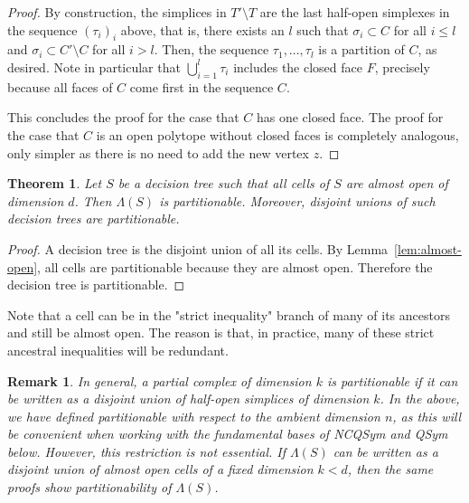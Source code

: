 \documentclass[12pt,reqno]{amsart}
\numberwithin{definition}{section}
\newtheorem{theorem}[definition]{Theorem}
\newtheorem{remark}[definition]{Remark}
\theoremstyle{definition}
\newcommand{\RR}{\mathbb{R}}
\newcommand{\allow}{\Lambda} %
\newcommand{\allowP}{\allow_{\RR^n_{> 0}}} %
\newcommand{\allowC}{\allow_{(0,1)^n}} %
\begin{document}
\begin{proof}
By construction, the simplices in $T'\setminus T$ are the last half-open simplexes in the sequence $(\tau_i)_i$ above, that is, there exists an $l$ such that $\sigma_i\subset C$ for all $i\leq l$ and $\sigma_i\subset C'\setminus C$ for all $i>l$. Then, the sequence $\tau_1,\ldots,\tau_l$ is a partition of $C$, as desired. Note in particular that $\bigcup_{i=1}^l \tau_i$ includes the closed face $F$, precisely because all faces of $C$ come first in the sequence $C$.

This concludes the proof for the case that $C$ has one closed face. The proof for the case that $C$ is an open polytope without closed faces is completely analogous, only simpler as there is no need to add the new vertex $z$.
\end{proof}

\begin{theorem}
\label{thm:decision}
Let $S$ be a decision tree such that all cells of $S$ are almost open of dimension $d$. Then $\allow(S)$ is partitionable. Moreover, disjoint unions of such decision trees are partitionable.
\end{theorem}

\begin{proof} 
A decision tree is the disjoint union of all its cells. By Lemma~\ref{lem:almost-open}, all cells are partitionable because they are almost open. Therefore the decision tree is partitionable.
\end{proof}

Note that a cell can be in the "strict inequality" branch of many of its ancestors and still be almost open. The reason is that, in practice, many of these strict ancestral inequalities will be redundant.


\begin{remark}
In general, a partial complex of dimension $k$ is partitionable if it can be written as a disjoint union of half-open simplices of dimension $k$. In the above, we have defined partitionable with respect to the ambient dimension $n$, as this will be convenient when working with the fundamental bases of NCQSym and QSym below. However, this restriction is not essential. If $\allow(S)$ can be written as a disjoint union of almost open cells of a fixed dimension $k<d$, then the same proofs show partitionability of $\allow(S)$.
\end{remark}
\end{document}

